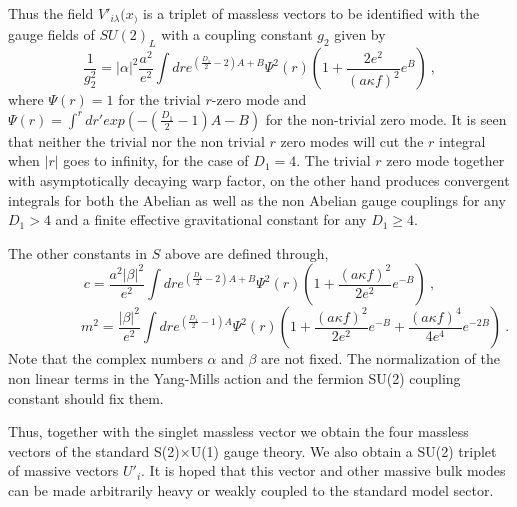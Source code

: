 \documentclass[a4paper,12pt]{article}
\begin{document}
Thus the field $V'_{i\lambda}(x_)$ is  a triplet of massless
vectors to be identified with the gauge fields of $SU(2)_L$ with a
coupling constant $g_2$ given by
\begin{equation}
\frac{1}{g_2^{2}} = |\alpha|^2\frac{a^2}{e^2}\int dr e^{(
\frac{D_1}{2}-2)A +B} \Psi^2(r) \left( 1 + \frac{2e^2}{(a\kappa
f)^2} e^{B}\right)~,
\end{equation}
where $\Psi(r) =1$ for the trivial $r$-zero mode and $\Psi (r)=
\int^r dr' exp \left( -( \frac{D_1}{2}-1)A-B\right)$ for the
non-trivial zero mode. It is seen that  neither the trivial nor the
non trivial $r$ zero modes  will cut the $r$ integral when $|r|$ goes
to infinity, for the case of $D_1=4$. The trivial $r$ zero mode
together with asymptotically decaying warp factor, on the other hand
produces convergent integrals for both the Abelian as well as the non
Abelian gauge couplings for any $D_1> 4$ and a finite effective
gravitational constant for any $D_1\geq 4$.

The other constants in $S$ above are defined through,
\begin{equation}
c=\frac{a^2|\beta|^2}{e^2}\int dr e^{( \frac{D_1}{2}-2)A +B}
\Psi^2(r)\left( 1 + \frac{(a\kappa f)^2}{2e^2} e^{-B}\right)~,
\end{equation}
\begin{equation}
\quad\quad\quad\quad\quad  m^2 = \frac{|\beta|^2}{e^2}
\int dr e^{(
\frac{D_1}{2}-1)A }  \Psi^2(r)\left( 1 + \frac{(a\kappa
f)^2}{2e^2} e^{-B} + \frac{(a\kappa f)^4}{4e^4} e^{-2B}\right)~.
\end{equation}
Note that the complex numbers $\alpha$ and $\beta$ are not fixed.
The normalization of the non linear terms in the Yang-Mills action
and the fermion SU(2) coupling constant should fix them.

Thus, together with the singlet massless vector we obtain the four
massless vectors of the standard S(2)$\times$U(1) gauge theory.
We also obtain a SU(2) triplet of massive vectors $U'_i$. It is
hoped that this vector and other massive bulk modes can be made
 arbitrarily heavy or weakly coupled to the standard model
sector.
\end{document}
